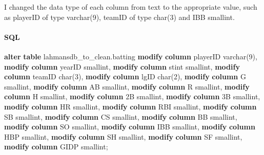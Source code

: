 \documentclass[11pt]{article}
\newenvironment{Shaded}{}{}
\newcommand{\KeywordTok}[1]{\textcolor[rgb]{0.00,0.44,0.13}{\textbf{{#1}}}}
\newcommand{\DataTypeTok}[1]{\textcolor[rgb]{0.56,0.13,0.00}{{#1}}}
\newcommand{\DecValTok}[1]{\textcolor[rgb]{0.25,0.63,0.44}{{#1}}}
\newcommand{\NormalTok}[1]{{#1}}
\begin{document}
    I changed the data type of each column from text to the appropriate
value, such as playerID of type varchar(9), teamID of type char(3) and
IBB smallint.

    \hypertarget{sql}{%
\paragraph{SQL}\label{sql}}

    \begin{Shaded}
\begin{Highlighting}[]
\KeywordTok{alter} \KeywordTok{table}\NormalTok{ lahmansdb\_to\_clean.batting}
    \KeywordTok{modify} \KeywordTok{column}\NormalTok{ playerID }\DataTypeTok{varchar}\NormalTok{(}\DecValTok{9}\NormalTok{),}
    \KeywordTok{modify} \KeywordTok{column}\NormalTok{ yearID }\DataTypeTok{smallint}\NormalTok{,}
    \KeywordTok{modify} \KeywordTok{column}\NormalTok{ stint }\DataTypeTok{smallint}\NormalTok{,}
    \KeywordTok{modify} \KeywordTok{column}\NormalTok{ teamID }\DataTypeTok{char}\NormalTok{(}\DecValTok{3}\NormalTok{),}
    \KeywordTok{modify} \KeywordTok{column}\NormalTok{ lgID }\DataTypeTok{char}\NormalTok{(}\DecValTok{2}\NormalTok{),}
    \KeywordTok{modify} \KeywordTok{column}\NormalTok{ G }\DataTypeTok{smallint}\NormalTok{,}
    \KeywordTok{modify} \KeywordTok{column}\NormalTok{ AB }\DataTypeTok{smallint}\NormalTok{,}
    \KeywordTok{modify} \KeywordTok{column}\NormalTok{ R }\DataTypeTok{smallint}\NormalTok{,}
    \KeywordTok{modify} \KeywordTok{column}\NormalTok{ H }\DataTypeTok{smallint}\NormalTok{,}
    \KeywordTok{modify} \KeywordTok{column}\NormalTok{ 2B }\DataTypeTok{smallint}\NormalTok{,}
    \KeywordTok{modify} \KeywordTok{column}\NormalTok{ 3B }\DataTypeTok{smallint}\NormalTok{,}
    \KeywordTok{modify} \KeywordTok{column}\NormalTok{ HR }\DataTypeTok{smallint}\NormalTok{,}
    \KeywordTok{modify} \KeywordTok{column}\NormalTok{ RBI }\DataTypeTok{smallint}\NormalTok{,}
    \KeywordTok{modify} \KeywordTok{column}\NormalTok{ SB }\DataTypeTok{smallint}\NormalTok{,}
    \KeywordTok{modify} \KeywordTok{column}\NormalTok{ CS }\DataTypeTok{smallint}\NormalTok{,}
    \KeywordTok{modify} \KeywordTok{column}\NormalTok{ BB }\DataTypeTok{smallint}\NormalTok{,}
    \KeywordTok{modify} \KeywordTok{column}\NormalTok{ SO }\DataTypeTok{smallint}\NormalTok{,}
    \KeywordTok{modify} \KeywordTok{column}\NormalTok{ IBB }\DataTypeTok{smallint}\NormalTok{,}
    \KeywordTok{modify} \KeywordTok{column}\NormalTok{ HBP }\DataTypeTok{smallint}\NormalTok{,}
    \KeywordTok{modify} \KeywordTok{column}\NormalTok{ SH }\DataTypeTok{smallint}\NormalTok{,}
    \KeywordTok{modify} \KeywordTok{column}\NormalTok{ SF }\DataTypeTok{smallint}\NormalTok{,}
    \KeywordTok{modify} \KeywordTok{column}\NormalTok{ GIDP }\DataTypeTok{smallint}\NormalTok{;}
\end{Highlighting}
\end{Shaded}
\end{document}
